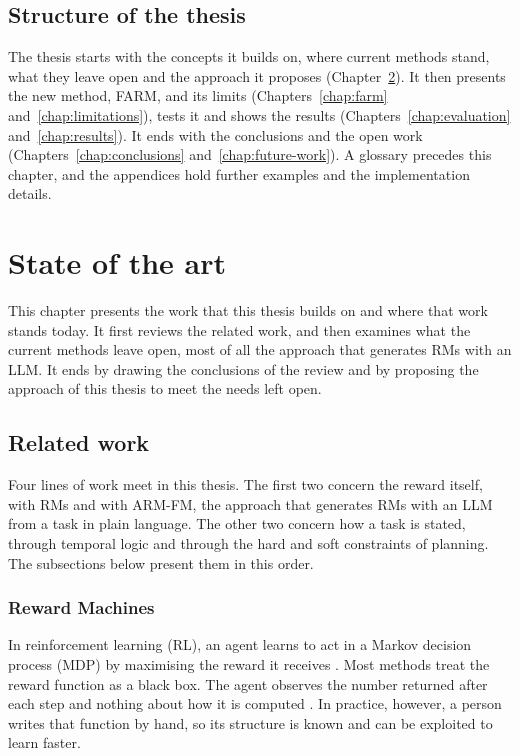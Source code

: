 \documentclass[11pt,english,listoffigures,listoftables]{tfgetsinf}
\begin{document}
\section{Structure of the thesis}
The thesis starts with the concepts it builds on, where current methods stand, what they leave open and the approach it proposes (Chapter~\ref{chap:sota}). It then presents the new method, FARM, and its limits (Chapters~\ref{chap:farm} and~\ref{chap:limitations}), tests it and shows the results (Chapters~\ref{chap:evaluation} and~\ref{chap:results}). It ends with the conclusions and the open work (Chapters~\ref{chap:conclusions} and~\ref{chap:future-work}). A glossary precedes this chapter, and the appendices hold further examples and the implementation details.


\chapter{State of the art}
\label{chap:sota}
This chapter presents the work that this thesis builds on and where that work stands today. It first reviews the related work, and then examines what the current methods leave open, most of all the approach that generates RMs with an LLM. It ends by drawing the conclusions of the review and by proposing the approach of this thesis to meet the needs left open.

\section{Related work}
Four lines of work meet in this thesis. The first two concern the reward itself, with RMs and with ARM-FM, the approach that generates RMs with an LLM from a task in plain language. The other two concern how a task is stated, through temporal logic and through the hard and soft constraints of planning. The subsections below present them in this order.

\subsection{Reward Machines}
\label{sec:sota-rm}
In reinforcement learning (RL), an agent learns to act in a Markov decision process (MDP) by maximising the reward it receives \cite{sutton2018reinforcement}. Most methods treat the reward function as a black box. The agent observes the number returned after each step and nothing about how it is computed \cite{icarte2022reward}. In practice, however, a person writes that function by hand, so its structure is known and can be exploited to learn faster.
\end{document}
